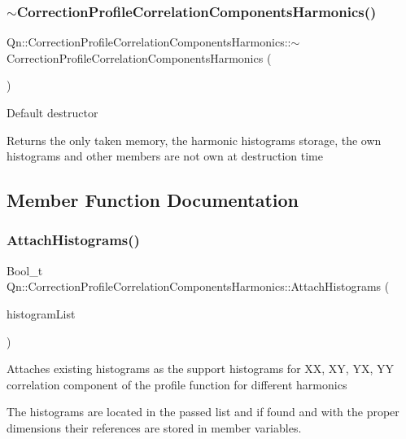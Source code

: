 \subsubsection{\texorpdfstring{$\sim$\+Correction\+Profile\+Correlation\+Components\+Harmonics()}{~CorrectionProfileCorrelationComponentsHarmonics()}}
{\footnotesize\ttfamily Qn\+::\+Correction\+Profile\+Correlation\+Components\+Harmonics\+::$\sim$\+Correction\+Profile\+Correlation\+Components\+Harmonics (\begin{DoxyParamCaption}{ }\end{DoxyParamCaption})\hspace{0.3cm}{\ttfamily [virtual]}}

Default destructor

Returns the only taken memory, the harmonic histograms storage, the own histograms and other members are not own at destruction time 

\subsection{Member Function Documentation}
\mbox{\label{classQn_1_1CorrectionProfileCorrelationComponentsHarmonics_ab338a5263d8eb124c3a6a0bbde5f72e3}} 
\subsubsection{\texorpdfstring{Attach\+Histograms()}{AttachHistograms()}}
{\footnotesize\ttfamily Bool\+\_\+t Qn\+::\+Correction\+Profile\+Correlation\+Components\+Harmonics\+::\+Attach\+Histograms (\begin{DoxyParamCaption}\item[{T\+List $\ast$}]{histogram\+List }\end{DoxyParamCaption})\hspace{0.3cm}{\ttfamily [virtual]}}

Attaches existing histograms as the support histograms for XX, XY, YX, YY correlation component of the profile function for different harmonics

The histograms are located in the passed list and if found and with the proper dimensions their references are stored in member variables.

